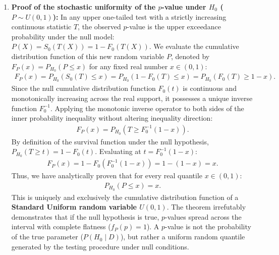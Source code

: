 \begin{solucion}
	\begin{enumerate}
		\item \textbf{Proof of the stochastic uniformity of the $p$-value under $H_0$ ($P \sim U(0,1)$):}
		In any upper one-tailed test with a strictly increasing continuous statistic $T$, the observed $p$-value is the upper exceedance probability under the null model: $P(X) = S_0(T(X)) = 1 - F_0(T(X))$.
		We evaluate the cumulative distribution function of this new random variable $P$, denoted by $F_P(x) = P_{H_0}(P \le x)$ for any fixed real number $x \in (0,1)$:
		\begin{align}
			F_P(x) = P_{H_0}\left( S_0(T) \le x \right) = P_{H_0}\left( 1 - F_0(T) \le x \right) = P_{H_0}\left( F_0(T) \ge 1 - x \right).
		\end{align}
		Since the null cumulative distribution function $F_0(t)$ is continuous and monotonically increasing across the real support, it possesses a unique inverse function $F_0^{-1}$. Applying the monotonic inverse operator to both sides of the inner probability inequality without altering inequality direction:
		\begin{align}
			F_P(x) = P_{H_0}\left( T \ge F_0^{-1}(1 - x) \right).
		\end{align}
		By definition of the survival function under the null hypothesis, $P_{H_0}(T \ge t) = 1 - F_0(t)$. Evaluating at $t = F_0^{-1}(1 - x)$:
		\begin{align}
			F_P(x) = 1 - F_0\left( F_0^{-1}(1 - x) \right) = 1 - (1 - x) = x.
		\end{align}
		Thus, we have analytically proven that for every real quantile $x \in (0,1)$:
		\begin{align}
			P_{H_0}(P \le x) = x.
		\end{align}
		This is uniquely and exclusively the cumulative distribution function of a \textbf{Standard Uniform random variable $U(0,1)$}. The theorem irrefutably demonstrates that if the null hypothesis is true, $p$-values spread across the interval with complete flatness ($f_P(p) = 1$). A $p$-value is not the probability of the true parameter ($P(H_0 \mid D)$), but rather a uniform random quantile generated by the testing procedure under null conditions.
		

\end{enumerate}
\end{solucion}
